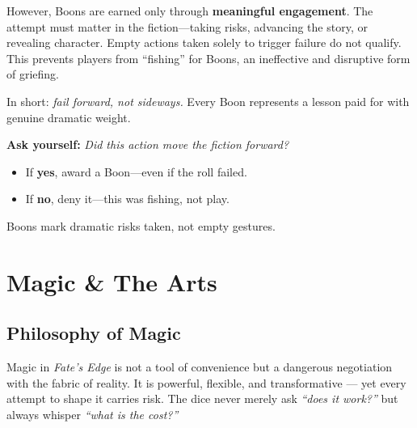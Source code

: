 \documentclass[12pt]{book}
\begin{document}
However, Boons are earned only through \textbf{meaningful engagement}. The attempt must matter in the fiction—taking risks, advancing the story, or revealing character. Empty actions taken solely to trigger failure do not qualify. This prevents players from ``fishing'' for Boons, an ineffective and disruptive form of griefing.  

In short: \emph{fail forward, not sideways.} Every Boon represents a lesson paid for with genuine dramatic weight.

\begin{tcolorbox}[title=GM Callout: Awarding Boons,colback=black!2,colframe=black!40!white]
  \textbf{Ask yourself:} \emph{Did this action move the fiction forward?}  
  
  \begin{itemize}
    \item If \textbf{yes}, award a Boon—even if the roll failed.  
    \item If \textbf{no}, deny it—this was fishing, not play.  
  \end{itemize}
  
  Boons mark dramatic risks taken, not empty gestures.
  \end{tcolorbox}

\part{Magic \& The Arts}

\chapter{Philosophy of Magic}

Magic in \textit{Fate’s Edge} is not a tool of convenience but a dangerous negotiation with the fabric of reality.  
It is powerful, flexible, and transformative — yet every attempt to shape it carries risk. The dice never merely ask \emph{“does it work?”} but always whisper \emph{“what is the cost?”}
\end{document}
